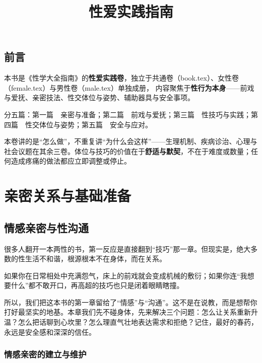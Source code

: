 \documentclass[12pt,UTF8]{ctexbook}
\title{\heiti\zihao{0} 性爱实践指南}
\author{}
\date{}
\newcommand{\keyword}[1]{\textbf{#1}}
\begin{document}
\maketitle

\frontmatter

\chapter{前言}

本书是《性学大全指南》的\keyword{性爱实践卷}，独立于共通卷（book.tex）、女性卷（female.tex）与男性卷（male.tex）单独成册，
内容聚焦于\keyword{性行为本身}——前戏与爱抚、亲密技法、性交体位与姿势、辅助器具与安全事项。

分五篇：第一篇　亲密与准备；第二篇　前戏与爱抚；第三篇　性技巧与实践；第四篇　性交体位与姿势；第五篇　安全与应对。

\begin{tcolorbox}[colback=pink!5!white,colframe=red!50!black,title=使用说明]
本卷讲的是“怎么做”，不重复讲“为什么会这样”——生理机制、疾病诊治、心理与社会议题在其余三卷。体位与技巧的价值在于\keyword{舒适与默契}，不在于难度或数量；任何造成疼痛的做法都应立即调整或停止。
\end{tcolorbox}

\tableofcontents

\listoffigures
\listoftables

\mainmatter

\part{亲密关系与基础准备}

\chapter{情感亲密与性沟通}

很多人翻开一本两性的书，第一反应是直接翻到“技巧”那一章。但现实是，绝大多数的性生活不和谐，根源根本不在身体，而在关系。

如果你在日常相处中充满怨气，床上的前戏就会变成机械的敷衍；如果你连“我想要什么”都不敢开口，再高超的技巧也只是闭着眼睛瞎撞。

所以，我们把这本书的第一章留给了“情感”与“沟通”。这不是在说教，而是想帮你打好最坚实的地基。本章我们先不碰身体，先来解决三个问题：怎么让关系重新升温？怎么把话聊到心坎里？怎么理直气壮地表达需求和拒绝？记住，最好的春药，永远是安全感和深深的信任。

\section{情感亲密的建立与维护}
\end{document}
